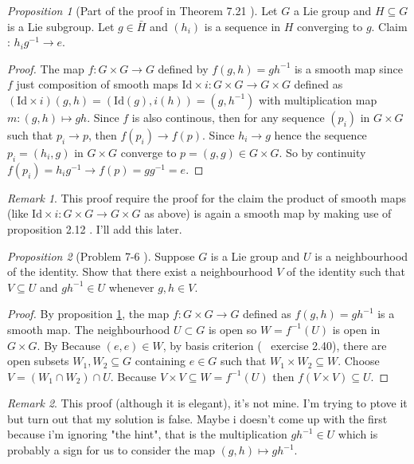 \documentclass[a4paper]{article}
\theoremstyle{remark}
\newtheorem*{remark}{Remark}
\newtheorem{prop}{Proposition}
\begin{document}
\begin{prop}[Part of the proof in Theorem 7.21 \cite{LeeSM}]\label{[Part of the proof in Theorem 7.21}
Let $G$ a Lie group and $H\subseteq G$ is a Lie subgroup. Let $g \in \bar{H}$ and $(h_i)$ is a sequence in $H$ converging to $g$. Claim : $h_ig^{-1} \to e$.
\end{prop}
\begin{proof}
The map $f: G \times G \to G$ defined by $f(g,h)=gh^{-1}$ is a smooth map since $f$ just composition of smooth maps $\text{Id} \times i : G \times G \to G \times G$ defined as $(\text{Id} \times i) (g,h) = (\text{Id}(g),i(h)) = (g,h^{-1})$ with multiplication map $m : (g,h) \mapsto gh$. Since $f$ is also continous, then for any sequence $(p_i)$ in $G \times G$ such that $p_i \to p$, then $f(p_i) \to f(p)$. Since $h_i \to g$ hence the sequence $p_i = (h_i,g)$ in $G \times G$ converge to $p=(g,g) \in G \times G$. So by continuity $f(p_i) = h_i g^{-1} \to f(p)=gg^{-1} = e$.
\end{proof}
\begin{remark}
This proof require the proof for the claim the product of smooth maps (like $\text{Id} \times i : G \times G \to G \times G$ as above) is again a smooth map by making use of proposition 2.12 \cite{LeeSM}. I'll add this later.
\end{remark}

\begin{prop}[Problem 7-6 \cite{LeeSM}]
Suppose $G$ is a Lie group and $U$ is a neighbourhood of the identity. Show that there exist a neighbourhood $V$ of the identity such that $V\subseteq U$ and $gh^{-1} \in U$ whenever $g,h \in V$.
\end{prop}
\begin{proof}
By proposition \ref{[Part of the proof in Theorem 7.21}, the map $f : G \times G \to G$ defined as $f(g,h) = gh^{-1}$ is a smooth map. The neighbourhood $U \subset G$ is open so $W = f^{-1}(U)$ is open in $G \times G$. By Because $(e,e) \in W$, by basis criterion (\cite{LeeTM} \, exercise 2.40), there are open subsets $W_1,W_2 \subseteq G$ containing $e\in G$ such that $W_1\times W_2 \subseteq W$. Choose $V = (W_1 \cap W_2) \cap U$. Because $V \times V \subseteq W=f^{-1}(U)$ then $f(V \times V) \subseteq U$.
\end{proof}
\begin{remark}
This proof (although it is elegant), it's not mine. I'm trying to ptove it but turn out that my solution is false. Maybe i doesn't come up with the first because i'm ignoring "the hint", that is the multiplication $gh^{-1} \in U$ which is probably a sign for us to consider the map $(g,h) \mapsto gh^{-1}$.
\end{remark}
\end{document}
